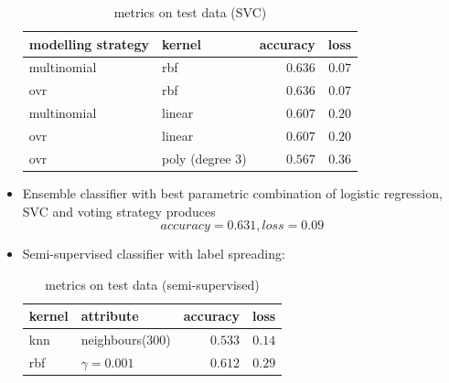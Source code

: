 \documentclass[fleqn,10pt]{SelfArx} %
\begin{document}
\begin{itemize}
  \begin{table}[H]
    \caption{metrics on test data (SVC)}
    \centering
    \begin{tabular}{llrr}
      \toprule
      modelling strategy & kernel & accuracy & loss \\
      \midrule
      multinomial & rbf & $0.636$ & $0.07$ \\
      ovr & rbf & $0.636$ & $0.07$ \\
      multinomial & linear & $0.607$ & $0.20$ \\
      ovr & linear & $0.607$ & $0.20$ \\
      ovr & poly (degree 3) & $0.567$ & $0.36$ \\
      \bottomrule
    \end{tabular}
  \end{table}
  \item Ensemble classifier with best parametric combination of logistic regression, SVC and voting strategy produces
  $$accuracy = 0.631, loss = 0.09$$
  \item Semi-supervised classifier with label spreading:
  \begin{table}[H]
    \caption{metrics on test data (semi-supervised)}
    \centering
    \begin{tabular}{llrr}
      \toprule
      kernel & attribute & accuracy & loss\\
      \midrule
      knn & neighbours(300) & $0.533$ & $0.14$ \\
      rbf & $\gamma=0.001$ & $0.612$ & $0.29$ \\
      \bottomrule
    \end{tabular}
  \end{table}
\end{itemize}
\end{document}
